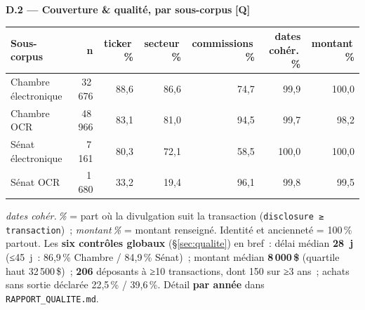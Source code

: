 \documentclass[11pt,a4paper]{article}
\newcommand{\co}[1]{\texttt{\small #1}}
\begin{document}
\textbf{D.2 — Couverture \& qualité, par sous-corpus} \hfill {\footnotesize\textbf{[Q]}}
\begin{center}\small
\begin{tabular}{l r rrr r r}
\toprule
\bfseries Sous-corpus & \bfseries n & \bfseries ticker\,\% & \bfseries secteur\,\% & \bfseries commissions\,\% & \bfseries dates cohér.\,\% & \bfseries montant\,\%\\
\midrule
{\color{houseC}Chambre électronique} & 32\,676 & 88,6 & 86,6 & 74,7 & 99,9 & 100,0 \\
{\color{houseC}Chambre OCR} & 48\,966 & 83,1 & 81,0 & 94,5 & 99,7 & 98,2 \\
{\color{senateC}Sénat électronique} & 7\,161 & 80,3 & 72,1 & 58,5 & 100,0 & 100,0 \\
{\color{senateC}Sénat OCR} & 1\,680 & 33,2 & 19,4 & 96,1 & 99,8 & 99,5 \\
\bottomrule
\end{tabular}
\end{center}
{\footnotesize \emph{dates cohér.\,\%} = part où la divulgation suit la transaction (\co{disclosure ≥
transaction})~; \emph{montant\,\%} = montant renseigné. Identité et ancienneté = 100\,\% partout. Les
\textbf{six contrôles globaux} (§\ref{sec:qualite}) en bref~: délai médian \textbf{28~j} (≤45~j~: 86,9\,\%
Chambre / 84,9\,\% Sénat)~; montant médian \textbf{8\,000\,\$} (quartile haut 32\,500\,\$)~; \textbf{206}
déposants à ≥10 transactions, dont 150 sur ≥3 ans~; achats sans sortie déclarée 22,5\,\% / 39,6\,\%. Détail
\textbf{par année} dans \co{RAPPORT_QUALITE.md}.}
\end{document}
